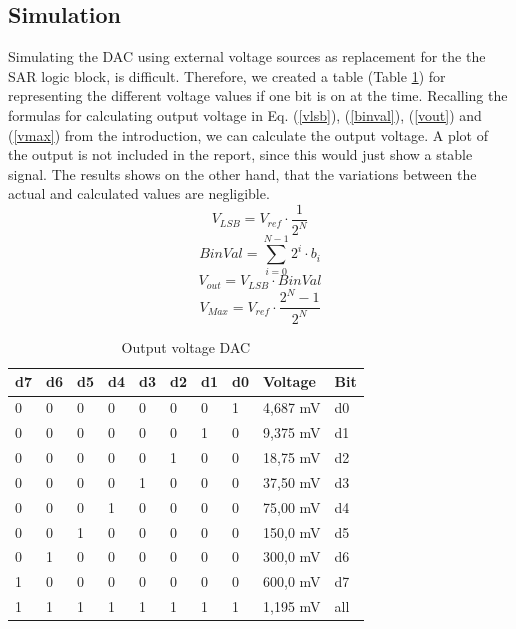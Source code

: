 \documentclass[english, 12pt, a4paper]{ifimaster}
\begin{document}
\subsection{Simulation}
Simulating the DAC using external voltage sources as replacement for the the SAR logic block, is difficult. Therefore, we created a table (Table \ref{tab:voltage:out:dac}) for representing the different 
voltage values if one bit is on at the time. Recalling the formulas for calculating output voltage in Eq. (\ref{vlsb}), (\ref{binval}), (\ref{vout}) and (\ref{vmax}) from the introduction, 
we can calculate the output voltage. A plot of the output is not included in the report, since this would just show a stable signal. The results shows on the other hand, that the variations between 
the actual and calculated values are negligible. 
\begin{equation}\label{vlsb}
 V_{LSB} = V_{ref} \cdot \frac{1}{2^{N}}
\end{equation}
\begin{equation}\label{binval}
 BinVal = \sum_{i=0}^{N-1} 2^{i} \cdot b_{i}
\end{equation}
\begin{equation}\label{vout}
 V_{out} = V_{LSB} \cdot BinVal
\end{equation}
\begin{equation}\label{vmax}
 V_{Max} = V_{ref} \cdot \frac{2^{N}-1}{2^{N}}
\end{equation}
\begin{table}[!ht]
\centering
\begin{tabular}{|l|l|l|l|l|l|l|l|l|l|}
\hline
d7 & d6 & d5 & d4 & d3 & d2 & d1 & d0 & Voltage  & Bit \\ \hline
0  & 0  & 0  & 0  & 0  & 0  & 0  & 1  & 4,687 mV & d0  \\ \hline
0  & 0  & 0  & 0  & 0  & 0  & 1  & 0  & 9,375 mV & d1  \\ \hline
0  & 0  & 0  & 0  & 0  & 1  & 0  & 0  & 18,75 mV & d2  \\ \hline
0  & 0  & 0  & 0  & 1  & 0  & 0  & 0  & 37,50 mV & d3  \\ \hline
0  & 0  & 0  & 1  & 0  & 0  & 0  & 0  & 75,00 mV & d4  \\ \hline
0  & 0  & 1  & 0  & 0  & 0  & 0  & 0  & 150,0 mV & d5  \\ \hline
0  & 1  & 0  & 0  & 0  & 0  & 0  & 0  & 300,0 mV & d6  \\ \hline
1  & 0  & 0  & 0  & 0  & 0  & 0  & 0  & 600,0 mV & d7  \\ \hline
1  & 1  & 1  & 1  & 1  & 1  & 1  & 1  & 1,195 mV & all \\ \hline
\end{tabular}
\caption{Output voltage DAC}
\label{tab:voltage:out:dac}
\end{table}
\end{document}
